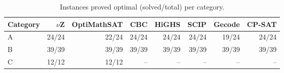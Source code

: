 \begin{table}[t]
\centering
\caption{Instances proved optimal (solved/total) per category.}
\label{tab:exp-solved}
\small
\begin{tabular}{@{}lrrrrrrr@{}}
\toprule
Category & $\nu$Z & OptiMathSAT & CBC & HiGHS & SCIP & Gecode & CP-SAT \\
\midrule
A & 24/24 & 22/24 & 24/24 & 24/24 & 24/24 & 19/24 & 24/24 \\
B & 39/39 & 39/39 & 39/39 & 39/39 & 39/39 & 39/39 & 39/39 \\
C & 12/12 & 12/12 & -- & -- & -- & -- & -- \\
\bottomrule
\end{tabular}
\end{table}
